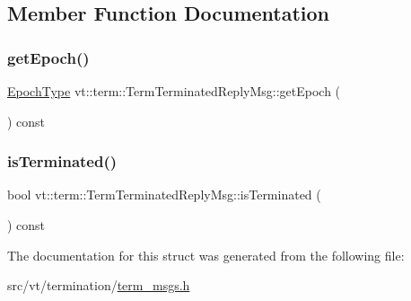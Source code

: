 \subsection{Member Function Documentation}
\mbox{\label{structvt_1_1term_1_1_term_terminated_reply_msg_a698733a686553c57a4da26f72fdfb9ab}} 
\subsubsection{\texorpdfstring{get\+Epoch()}{getEpoch()}}
{\footnotesize\ttfamily \hyperlink{namespacevt_a985a5adf291c34a3ca263b3378388236}{Epoch\+Type} vt\+::term\+::\+Term\+Terminated\+Reply\+Msg\+::get\+Epoch (\begin{DoxyParamCaption}{ }\end{DoxyParamCaption}) const\hspace{0.3cm}{\ttfamily [inline]}}

\mbox{\label{structvt_1_1term_1_1_term_terminated_reply_msg_abbac7b1c9254980d0d0c25e1959a6976}} 
\subsubsection{\texorpdfstring{is\+Terminated()}{isTerminated()}}
{\footnotesize\ttfamily bool vt\+::term\+::\+Term\+Terminated\+Reply\+Msg\+::is\+Terminated (\begin{DoxyParamCaption}{ }\end{DoxyParamCaption}) const\hspace{0.3cm}{\ttfamily [inline]}}



The documentation for this struct was generated from the following file\+:\begin{DoxyCompactItemize}
\item 
src/vt/termination/\hyperlink{term__msgs_8h}{term\+\_\+msgs.\+h}\end{DoxyCompactItemize}
